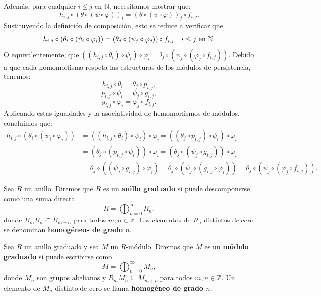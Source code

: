 Además, para cualquier \(i \leq j\) en \(\mathbb{N}\), necesitamos mostrar que:
\[
h_{i,j} \circ (\theta \circ (\psi \circ \varphi))_i = (\theta \circ (\psi \circ \varphi))_j \circ f_{i,j}.
\]
Sustituyendo la definición de composición, esto se reduce a verificar que
\[
h_{i,j} \circ (\theta_i \circ (\psi_i \circ \varphi_i)) = (\theta_j \circ (\psi_j \circ \varphi_j)) \circ f_{i,j} \quad  i \leq j \text{ en } \mathbb{N}.
\]
O equivalentemente, que $((h_{i,j} \circ \theta_i) \circ \psi_i) \circ \varphi_i = \theta_j \circ (\psi_j \circ (\varphi_j \circ f_{i,j}))$.
Debido a que cada homomorfismo respeta las estructuras de los módulos de persistencia, tenemos:
\[
h_{i,j} \circ \theta_i = \theta_j \circ p_{i,j},
\]
\[
p_{i,j} \circ \psi_i = \psi_j \circ g_{i,j},
\]
\[
g_{i,j} \circ \varphi_i = \varphi_j \circ f_{i,j}.
\]
Aplicando estas igualdades y la asociatividad de homomorfismos de módulos, concluimos que:
\begin{align*}
h_{i,j} \circ (\theta_i \circ (\psi_i \circ \varphi_i)) &= ((h_{i,j} \circ \theta_i) \circ \psi_i) \circ \varphi_i = ((\theta_j \circ p_{i,j}) \circ \psi_i) \circ \varphi_i \\
&= (\theta_j \circ (p_{i,j} \circ \psi_i)) \circ \varphi_i = (\theta_j \circ (\psi_j \circ g_{i,j})) \circ \varphi_i \\
&= \theta_j \circ ((\psi_j \circ g_{i,j}) \circ \varphi_i) = \theta_j \circ (\psi_j \circ (g_{i,j} \circ \varphi_i))
= \theta_j \circ (\psi_j \circ (\varphi_j \circ f_{i,j})).
\end{align*}

\begin{definicion}
	Sea \( R \) un anillo. Diremos que \( R \) es un \textbf{anillo graduado} si puede descomponerse como una suma directa
	\[
	R = \bigoplus_{n=0}^{\infty} R_n,
	\]
	donde \( R_m R_n \subseteq R_{m+n} \) para todos \( m, n \in \mathbb{Z} \). Los elementos de \( R_n \) distintos de cero se denominan \textbf{homogéneos de grado \( n \)}.
\end{definicion}

\begin{definicion}
	Sea \( R \) un anillo graduado y sea \( M \) un \( R \)-módulo. Diremos que \( M \) es un \textbf{módulo graduado} si puede escribirse como
	\[
	M = \bigoplus_{n=0}^{\infty} M_n,
	\]
	donde \( M_n \) son grupos abelianos y \( R_m M_n \subseteq M_{m+n} \) para todos \( m, n \in \mathbb{Z} \). Un elemento de \( M_n \) distinto de cero se llama \textbf{homogéneo de grado \( n \)}.
\end{definicion}


